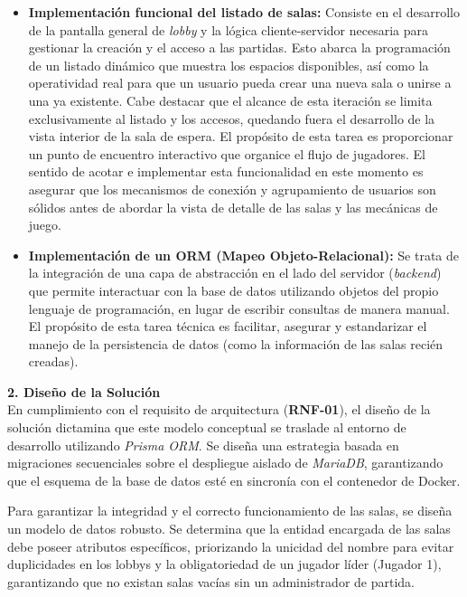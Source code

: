 \begin{itemize}
    \item \textbf{Implementación funcional del listado de salas:} Consiste en el desarrollo de la pantalla general de \textit{lobby} y la lógica cliente-servidor necesaria para gestionar la creación y el acceso a las partidas. Esto abarca la programación de un listado dinámico que muestra los espacios disponibles, así como la operatividad real para que un usuario pueda crear una nueva sala o unirse a una ya existente. Cabe destacar que el alcance de esta iteración se limita exclusivamente al listado y los accesos, quedando fuera el desarrollo de la vista interior de la sala de espera. El propósito de esta tarea es proporcionar un punto de encuentro interactivo que organice el flujo de jugadores. El sentido de acotar e implementar esta funcionalidad en este momento es asegurar que los mecanismos de conexión y agrupamiento de usuarios son sólidos antes de abordar la vista de detalle de las salas y las mecánicas de juego.

    \item \textbf{Implementación de un ORM (Mapeo Objeto-Relacional):} Se trata de la integración de una capa de abstracción en el lado del servidor (\textit{backend}) que permite interactuar con la base de datos utilizando objetos del propio lenguaje de programación, en lugar de escribir consultas de manera manual. El propósito de esta tarea técnica es facilitar, asegurar y estandarizar el manejo de la persistencia de datos (como la información de las salas recién creadas).
\end{itemize}

\textbf{2. Diseño de la Solución} \\
En cumplimiento con el requisito de arquitectura (\textbf{RNF-01}), el diseño de la solución dictamina que este modelo conceptual se traslade al entorno de desarrollo utilizando \textit{Prisma ORM}. Se diseña una estrategia basada en migraciones secuenciales sobre el despliegue aislado de \textit{MariaDB}, garantizando que el esquema de la base de datos esté en sincronía con el contenedor de Docker.

Para garantizar la integridad y el correcto funcionamiento de las salas, se diseña un modelo de datos robusto. Se determina que la entidad encargada de las salas debe poseer atributos específicos, priorizando la unicidad del nombre para evitar duplicidades en los lobbys y la obligatoriedad de un jugador líder (Jugador 1), garantizando que no existan salas vacías sin un administrador de partida.

